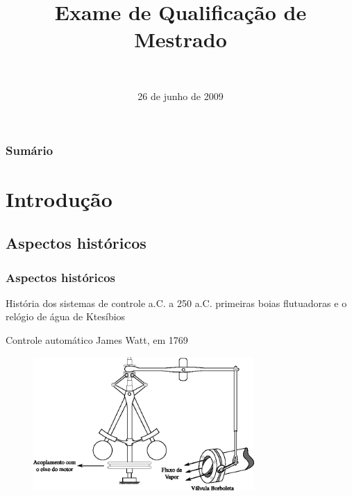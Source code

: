 \documentclass{beamer}
\title[Exame de Qualificação de Mestrado]
{
    Exame de Qualificação de Mestrado
}
\subtitle{\titulo}
\author[Diogo Leite Rebouças]
{
    \autor\\
    \emailautor
}
\institute
{
    Universidade Federal do Rio Grande do Norte\\
    Programa de Pós-Graduação em Engenharia Elétrica e Computação
}
\date{26 de junho de 2009}
\begin{document}
\maketitle


\begin{frame}
    \frametitle{Sumário}
    \small
    \tableofcontents
\end{frame}

\section{Introdução}
\subsection{Aspectos históricos}
\begin{frame}
    \frametitle{Aspectos históricos}
    História dos sistemas de controle  a.C. a 250 a.C. \implica
    primeiras boias flutuadoras e o relógio de água de Ktesíbios

    \vspace{0.25cm}

    Controle automático \implica James Watt, em 1769

\begin{figure}[htb]
\centering
    \includegraphics[width=0.75\textwidth]{imgs/introducao/eps/regulador_esferas}
\end{figure}
\end{frame}
\end{document}
